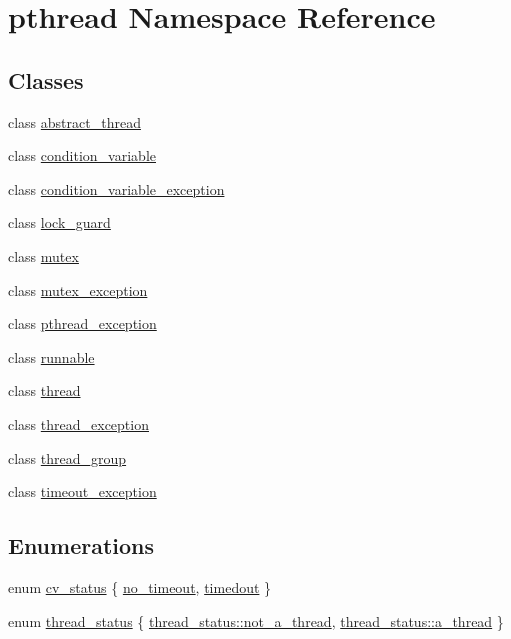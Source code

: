 \hypertarget{namespacepthread}{}\section{pthread Namespace Reference}
\label{namespacepthread}
\subsection*{Classes}
\begin{DoxyCompactItemize}
\item 
class \hyperlink{classpthread_1_1abstract__thread}{abstract\+\_\+thread}
\item 
class \hyperlink{classpthread_1_1condition__variable}{condition\+\_\+variable}
\item 
class \hyperlink{classpthread_1_1condition__variable__exception}{condition\+\_\+variable\+\_\+exception}
\item 
class \hyperlink{classpthread_1_1lock__guard}{lock\+\_\+guard}
\item 
class \hyperlink{classpthread_1_1mutex}{mutex}
\item 
class \hyperlink{classpthread_1_1mutex__exception}{mutex\+\_\+exception}
\item 
class \hyperlink{classpthread_1_1pthread__exception}{pthread\+\_\+exception}
\item 
class \hyperlink{classpthread_1_1runnable}{runnable}
\item 
class \hyperlink{classpthread_1_1thread}{thread}
\item 
class \hyperlink{classpthread_1_1thread__exception}{thread\+\_\+exception}
\item 
class \hyperlink{classpthread_1_1thread__group}{thread\+\_\+group}
\item 
class \hyperlink{classpthread_1_1timeout__exception}{timeout\+\_\+exception}
\end{DoxyCompactItemize}
\subsection*{Enumerations}
\begin{DoxyCompactItemize}
\item 
enum \hyperlink{namespacepthread_a823f88a2bf448bd5bd5273b826830bdd}{cv\+\_\+status} \{ \hyperlink{namespacepthread_a823f88a2bf448bd5bd5273b826830bdda633b1bc5140f77a22f2c26bea4fa3398}{no\+\_\+timeout}, 
\hyperlink{namespacepthread_a823f88a2bf448bd5bd5273b826830bdda1c2d3e88a4ad820053c817753867b31a}{timedout}
 \}
\item 
enum \hyperlink{namespacepthread_ac4b6e78f3d72c946ace7a92f3bec4101}{thread\+\_\+status} \{ \hyperlink{namespacepthread_ac4b6e78f3d72c946ace7a92f3bec4101a8414cd8c988083af4eabb1311df873cf}{thread\+\_\+status\+::not\+\_\+a\+\_\+thread}, 
\hyperlink{namespacepthread_ac4b6e78f3d72c946ace7a92f3bec4101a13b3689524b86ca2caaee82399099df1}{thread\+\_\+status\+::a\+\_\+thread}
 \}
\end{DoxyCompactItemize}
